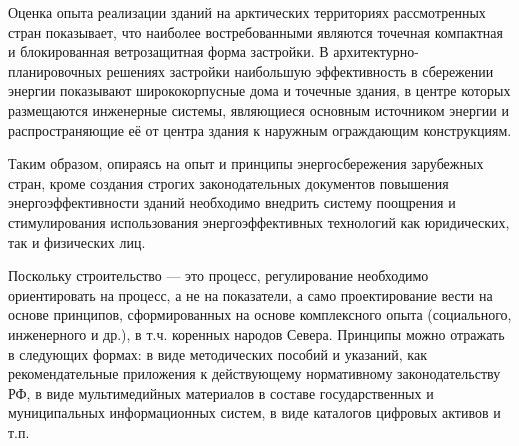 Оценка опыта реализации зданий на арктических территориях рассмотренных стран показывает, что наиболее востребованными являются точечная компактная и блокированная ветрозащитная форма
застройки. В архитектурно-планировочных решениях застройки наибольшую эффективность в сбережении энергии показывают ширококорпусные дома
и точечные здания, в центре которых размещаются инженерные системы, являющиеся основным источником энергии и распространяющие её от центра здания
к наружным ограждающим конструкциям.

Таким образом, опираясь на опыт и принципы энергосбережения зарубежных стран, кроме создания строгих законодательных документов повышения энергоэффективности зданий
необходимо внедрить систему поощрения и стимулирования использования энергоэффективных технологий как юридических, так и физических лиц.

Поскольку строительство --- это процесс, регулирование необходимо ориентировать на процесс, а не на показатели, а само проектирование вести на основе принципов,
сформированных на основе комплексного опыта (социального, инженерного и др.), в т.ч. коренных народов Севера.
Принципы можно отражать в следующих формах: в виде методических пособий и указаний, как рекомендательные приложения к действующему нормативному законодательству РФ,
в виде мультимедийных материалов в составе государственных и муниципальных информационных систем, в виде каталогов цифровых активов и т.п.


